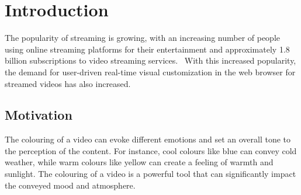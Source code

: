 \documentclass[../MasterThesis.tex]{subfiles}
\begin{document}
	\newpage
	\section{Introduction} \label{section:introduction}
	
	
	The popularity of streaming is growing, with an increasing number of people using online streaming platforms for their entertainment and approximately 1.8 billion subscriptions to video streaming services.~\cite{nielsen, stats}
	With this increased popularity, the demand for user-driven real-time visual customization in the web browser for streamed videos has also increased.
	
	
	
	
	
	
	
	
	
	
	
	
	
	
	
	
	
	
	\subsection{Motivation} \label{subsection:motivation}
	
	
	The colouring of a video can evoke different emotions and set an overall tone to the perception of the content. For instance, cool colours like blue can convey cold weather, while warm colours like yellow can create a feeling of warmth and sunlight. 
	The colouring of a video is a powerful tool that can significantly impact the conveyed mood and atmosphere.~\cite{colorgrading1, colorgrading2}
	
	
	
\end{document}
